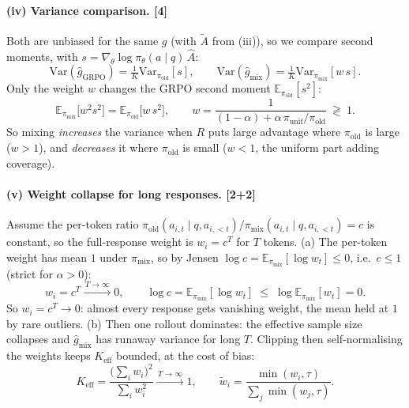 \documentclass[11pt,a4paper]{article}
\begin{document}
\paragraph{(iv) Variance comparison. \hfill\textnormal{[4]}}
Both are unbiased for the same $g$ (with $\tilde A$ from (iii)), so we compare second moments, with
$s=\nabla_\theta\log\pi_\theta(a\mid q)\,\hat A$:
\begin{equation}
  \mathrm{Var}(\hat g_{\mathrm{GRPO}})=\tfrac1K\mathrm{Var}_{\pi_{\mathrm{old}}}[s],\qquad
  \mathrm{Var}(\hat g_{\mathrm{mix}})=\tfrac1K\mathrm{Var}_{\pi_{\mathrm{mix}}}[w\,s].
  \label{eq:q3-var}
\end{equation}
Only the weight $w$ changes the GRPO second moment $\mathbb{E}_{\pi_{\mathrm{old}}}[s^2]$:
\begin{equation}
  \mathbb{E}_{\pi_{\mathrm{mix}}}\!\bigl[w^2 s^2\bigr]=\mathbb{E}_{\pi_{\mathrm{old}}}\!\bigl[w\,s^2\bigr],
  \qquad
  w=\frac{1}{(1-\alpha)+\alpha\,\pi_{\mathrm{unif}}/\pi_{\mathrm{old}}}\ \gtrless\ 1 .
  \label{eq:q3-var2}
\end{equation}
So mixing \emph{increases} the variance when $R$ puts large advantage where $\pi_{\mathrm{old}}$ is
large ($w>1$), and \emph{decreases} it where $\pi_{\mathrm{old}}$ is small ($w<1$, the uniform part
adding coverage).

\paragraph{(v) Weight collapse for long responses. \hfill\textnormal{[2+2]}}
Assume the per-token ratio $\pi_{\mathrm{old}}(a_{i,t}\mid q,a_{i,<t})/\pi_{\mathrm{mix}}(a_{i,t}\mid q,a_{i,<t})=c$ is constant, so the full-response weight is $w_i=c^{T}$ for $T$ tokens.
(a) The per-token weight has mean $1$ under $\pi_{\mathrm{mix}}$, so by Jensen
$\log c=\mathbb{E}_{\pi_{\mathrm{mix}}}[\log w_t]\le0$, i.e.\ $c\le1$ (strict for $\alpha>0$):
\begin{equation}
  w_i=c^{T}\xrightarrow{\,T\to\infty\,}0,\qquad
  \log c=\mathbb{E}_{\pi_{\mathrm{mix}}}[\log w_t]\;\le\;\log\mathbb{E}_{\pi_{\mathrm{mix}}}[w_t]=0 .
  \label{eq:q3-collapse}
\end{equation}
So $w_i=c^{T}\to0$: almost every response gets vanishing weight, the mean held at $1$ by rare outliers.
(b) Then one rollout dominates: the effective sample size collapses and $\hat g_{\mathrm{mix}}$ has
runaway variance for long $T$. Clipping then self-normalising the weights keeps $K_{\mathrm{eff}}$
bounded, at the cost of bias:
\begin{equation}
  K_{\mathrm{eff}}=\frac{\bigl(\sum_i w_i\bigr)^2}{\sum_i w_i^2}\xrightarrow{\,T\to\infty\,}1,
  \qquad
  \tilde w_i=\frac{\min(w_i,\tau)}{\sum_j \min(w_j,\tau)} .
  \label{eq:q3-ess}
\end{equation}
\end{document}
